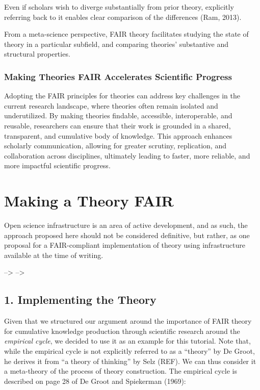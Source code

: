 \documentclass[
  man,floatsintext]{apa6}
\begin{document}
Even if scholars wish to diverge substantially from prior theory,
explicitly referring back to it enables clear comparison of the differences (Ram, 2013).

From a meta-science perspective, FAIR theory facilitates studying the state of theory in a particular subfield, and comparing theories' substantive and structural properties.

\subsubsection{Making Theories FAIR Accelerates Scientific Progress}\label{making-theories-fair-accelerates-scientific-progress}

Adopting the FAIR principles for theories can address key challenges in the current research landscape, where theories often remain isolated and underutilized. By making theories findable, accessible, interoperable, and reusable, researchers can ensure that their work is grounded in a shared, transparent, and cumulative body of knowledge. This approach enhances scholarly communication, allowing for greater scrutiny, replication, and collaboration across disciplines, ultimately leading to faster, more reliable, and more impactful scientific progress.

\section{Making a Theory FAIR}\label{making-a-theory-fair}

Open science infrastructure is an area of active development, and as such,
the approach proposed here should not be considered definitive,
but rather, as one proposal for a FAIR-compliant implementation of theory using infrastructure available at the time of writing.

--\textgreater{}
--\textgreater{}

\subsection{1. Implementing the Theory}\label{implementing-the-theory}

Given that we structured our argument around the importance of FAIR theory for cumulative knowledge production through scientific research around the \emph{empirical cycle},
we decided to use it as an example for this tutorial.
Note that, while the empirical cycle is not explicitly referred to as a ``theory'' by De Groot, he derives it from ``a theory of thinking'' by Selz (REF).
We can thus consider it a meta-theory of the process of theory construction.
The empirical cycle is described on page 28 of De Groot and Spiekerman (1969):
\end{document}
